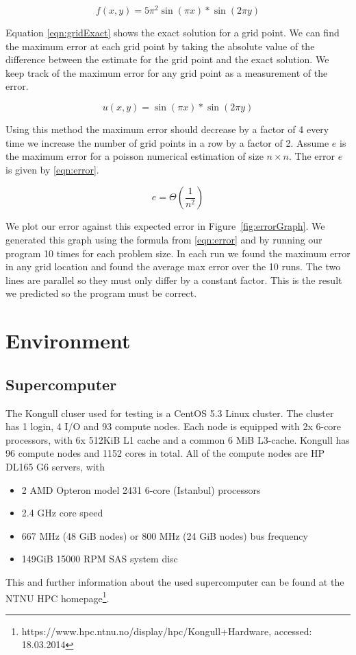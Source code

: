 \documentclass{article}
\begin{document}
	\begin{equation}
		\label{eqn:gridInitial}
		f(x,y) = 5\pi^2 \sin(\pi x)* \sin(2\pi y)
	\end{equation}

	Equation \ref{eqn:gridExact} shows the exact solution for a grid point. We can find the maximum error at each grid point by taking the absolute value of the difference between the estimate for the grid point and the exact solution. We keep track of the maximum error for any grid point as a measurement of the error.

	\begin{equation}
		\label{eqn:gridExact}
		u(x,y) = \sin(\pi x) * \sin(2 \pi y)
	\end{equation}

	Using this method the maximum error should decrease by a factor of 4 every time we increase the number of grid points in a row by a factor of 2. Assume $e$ is the maximum error for a poisson numerical estimation of size $n \times n$. The error $e$ is given by \ref{eqn:error}.

	\begin{equation}
		\label{eqn:error}
		e = \Theta(\frac{1}{n^2})
	\end{equation}

	We plot our error against this expected error in Figure~\ref{fig:errorGraph}. We generated this graph using the formula from \ref{eqn:error} and by running our program 10 times for each problem size. In each run we found the maximum error in any grid location and found the average max error over the 10 runs. The two lines are parallel so they must only differ by a constant factor. This is the result we predicted so the program must be correct.

\section{Environment}
\subsection{Supercomputer}
The Kongull cluser used for testing is a CentOS 5.3 Linux cluster. The cluster has 1 login, 4 I/O and 93 compute nodes. Each node is equipped with 2x 6-core processors, with 6x 512KiB L1 cache and a common 6 MiB L3-cache. Kongull has 96 compute nodes and 1152 cores in total. All of the compute nodes are HP DL165 G6 servers, with
\begin{itemize}
\item 2 AMD Opteron model 2431 6-core (Istanbul) processors
\item 2.4 GHz core speed
\item 667 MHz (48 GiB nodes) or 800 MHz (24 GiB nodes) bus frequency
\item 149GiB 15000 RPM SAS system disc
\end{itemize}
This and further information about the used supercomputer can be found at the NTNU HPC homepage\footnote{https://www.hpc.ntnu.no/display/hpc/Kongull+Hardware, accessed: 18.03.2014}.
\end{document}
